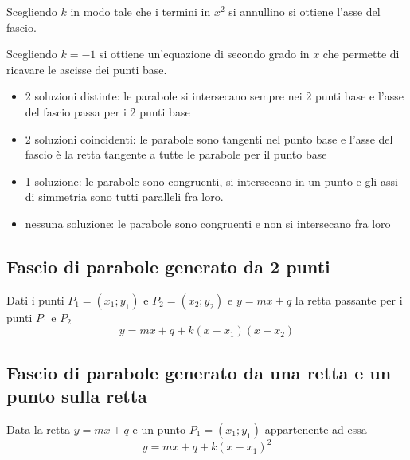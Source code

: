 \documentclass{article}
\begin{document}
  Scegliendo $k$ in modo tale che i termini in $x^2$ si annullino si ottiene l'asse del fascio.

  Scegliendo $k=-1$ si ottiene un'equazione di secondo grado in $x$ che permette di ricavare le ascisse dei punti base. 
  \begin{itemize}
    \item 2 soluzioni distinte: le parabole si intersecano sempre nei 2 punti base e l'asse del fascio passa per i 2 punti base
    \item 2 soluzioni coincidenti: le parabole sono tangenti nel punto base e l'asse del fascio è la retta tangente a tutte le parabole per il punto base
    \item 1 soluzione: le parabole sono congruenti, si intersecano in un punto e gli assi di simmetria sono tutti paralleli fra loro.
    \item nessuna soluzione: le parabole sono congruenti e non si intersecano fra loro
  \end{itemize}

  \subsection*{Fascio di parabole generato da 2 punti}
  Dati i punti $P_1=(x_1; y_1)$ e $P_2=(x_2; y_2)$ e $y=mx+q$ la retta passante per i punti $P_1$ e $P_2$
  \begin{equation}
    y = mx +q +k(x-x_1)(x-x_2)
  \end{equation}

  \subsection*{Fascio di parabole generato da una retta e un punto sulla retta}
  Data la retta $y=mx+q$ e un punto $P_1=(x_1;y_1)$ appartenente ad essa
  \begin{equation}
    y=mx+q + k(x-x_1)^2
  \end{equation}
\end{document}
